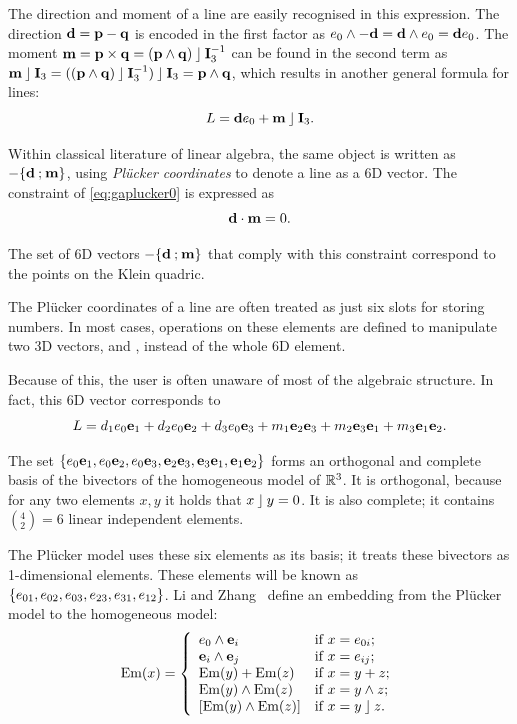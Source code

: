 The direction and moment of a line are easily recognised in this expression.  The direction $\mathbf{d} = \mathbf{p} - \mathbf{q}$ is encoded in the first factor as $e_0 \wedge -\mathbf{d} = \mathbf{d} \wedge e_0 = \mathbf{d} e_0$.  
The moment $\mathbf{m} = \mathbf{p} \times \mathbf{q} = (\mathbf{p} \wedge \mathbf{q}) \mathbin{\rfloor} \mathbf{I}_3^{-1}$ can be found in the second term as $\mathbf{m} \mathbin{\rfloor} \mathbf{I}_3 = ((\mathbf{p} \wedge \mathbf{q}) \mathbin{\rfloor} \mathbf{I}_3^{-1}) \mathbin{\rfloor} \mathbf{I}_3 = \mathbf{p} \wedge \mathbf{q}$, which results in another general formula for lines:
\begin{equation*}
  L = \mathbf{d} e_0 + \mathbf{m} \mathbin{\rfloor} \mathbf{I}_3.
\end{equation*}

Within classical literature of linear algebra, the same object is written as $-\{\mathbf{d} \mathbin{;} \mathbf{m}\}$, using \emph{Pl\"ucker coordinates} to denote a line as a 6D vector.  The constraint of \autoref{eq:gaplucker0} is expressed as 
\begin{equation} \label{eq:laplucker0}
  \mathbf{d} \mathbin{\cdot} \mathbf{m} = 0 .
\end{equation}

The set of 6D vectors $-\{\mathbf{d} \mathbin{;} \mathbf{m}\}$ that comply with this constraint correspond to the points on the Klein quadric.

The Pl\"ucker coordinates of a line are often treated as just six slots for storing numbers.  In most cases, operations on these elements are defined to manipulate two 3D vectors,  and , instead of the whole 6D element.

Because of this, the user is often unaware of most of the algebraic structure.  In fact, this 6D vector corresponds to
\begin{equation*}
  L = d_1 e_0\mathbf{e}_1 + d_2 e_0\mathbf{e}_2 + d_3 e_0\mathbf{e}_3 + m_1 \mathbf{e}_2\mathbf{e}_3 + m_2 \mathbf{e}_3\mathbf{e}_1 + m_3 \mathbf{e}_1\mathbf{e}_2 .
\end{equation*}

The set $\{e_0\mathbf{e}_1, e_0\mathbf{e}_2, e_0\mathbf{e}_3, \mathbf{e}_2\mathbf{e}_3, \mathbf{e}_3\mathbf{e}_1, \mathbf{e}_1\mathbf{e}_2\}$ forms an orthogonal and complete basis of the bivectors of the homogeneous model of $\mathbb{R}^3$.  It is orthogonal, because for any two elements $x, y$ it holds that $x \mathbin{\rfloor} y = 0$. It is also complete; it contains $(^4_2) = 6$ linear independent elements.

The Pl\"ucker model uses these six elements as its basis; it treats these bivectors as 1-dimensional elements.  These elements will be known as $\{e_{01}, e_{02}, e_{03}, e_{23}, e_{31}, e_{12}\}$.  Li and Zhang~\cite{Hongbo} define an embedding from the Pl\"ucker model to the homogeneous model:
\begin{equation} \label{eq:Em}
  \operatorname{Em}(x) = \left\{ 
    \begin{array}{ll}
      e_0 \wedge \mathbf{e}_i &\mbox{if $x = e_{0i}$}; \\
      \mathbf{e}_i \wedge \mathbf{e}_j &\mbox{if $x = e_{ij}$}; \\
      \operatorname{Em}(y) + \operatorname{Em}(z) &\mbox{if $x = y + z$}; \\
      \operatorname{Em}(y) \wedge \operatorname{Em}(z) &\mbox{if $x = y \wedge z$}; \\
      \left[\operatorname{Em}(y) \wedge \operatorname{Em}(z)\right] &\mbox{if $x = y \mathbin{\rfloor} z$}. \\
    \end{array}
    \right.
\end{equation}

